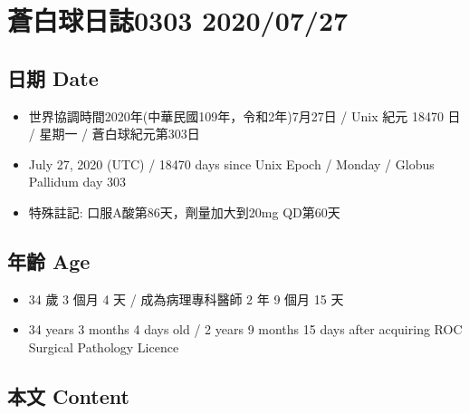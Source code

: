 \documentclass[
]{article}
\providecommand{\tightlist}{%
  \setlength{\itemsep}{0pt}\setlength{\parskip}{0pt}}
\begin{document}
\hypertarget{ux84bcux767dux7403ux65e5ux8a8c0303-20200727}{%
\section{蒼白球日誌0303
2020/07/27}\label{ux84bcux767dux7403ux65e5ux8a8c0303-20200727}}

\hypertarget{ux65e5ux671f-date-23}{%
\subsection{日期 Date}\label{ux65e5ux671f-date-23}}

\begin{itemize}
\tightlist
\item
  世界協調時間2020年(中華民國109年，令和2年)7月27日 / Unix 紀元 18470 日
  / 星期一 / 蒼白球紀元第303日
\item
  July 27, 2020 (UTC) / 18470 days since Unix Epoch / Monday / Globus
  Pallidum day 303
\item
  特殊註記: 口服A酸第86天，劑量加大到20mg QD第60天
\end{itemize}

\hypertarget{ux5e74ux9f61-age-23}{%
\subsection{年齡 Age}\label{ux5e74ux9f61-age-23}}

\begin{itemize}
\tightlist
\item
  34 歲 3 個月 4 天 / 成為病理專科醫師 2 年 9 個月 15 天
\item
  34 years 3 months 4 days old / 2 years 9 months 15 days after
  acquiring ROC Surgical Pathology Licence
\end{itemize}

\hypertarget{ux672cux6587-content-23}{%
\subsection{本文 Content}\label{ux672cux6587-content-23}}
\end{document}
